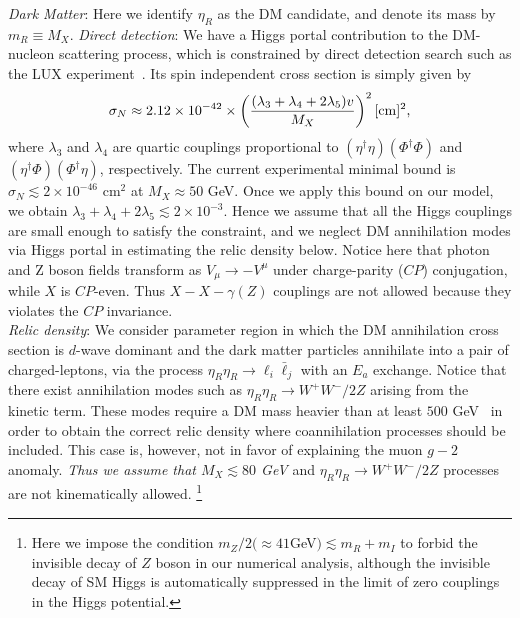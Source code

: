 \documentclass[%
showkeys,12pt,
preprint,preprintnumbers,nofootinbib,
groupedaddress,superscriptaddress,amsmath,amssymb]{revtex4}
\numberwithin{equation}{section}
\begin{document}
{\it Dark Matter}:
Here we identify $\eta_R$ as the DM candidate, and denote its mass by $m_{R}\equiv M_X$. 
{
{\it Direct detection}: We have a Higgs portal contribution to the DM-nucleon scattering process, which is constrained by direct detection search such as the LUX experiment~\cite{Akerib:2016vxi}.
Its spin independent cross section is simply given by~\cite{Baek:2016kud}
\begin{align}
\sigma_N\approx 2.12\times 10^{-42}\times\left(\frac{(\lambda_3+\lambda_4+2\lambda_5)v}{M_X}\right)^2 [{\rm cm}]^2,
\end{align}
where $\lambda_3$ and $\lambda_4$ are quartic couplings proportional to $(\eta^\dag\eta)(\Phi^\dag\Phi)$ and $(\eta^\dag\Phi)(\Phi^\dag\eta)$, respectively.
The current experimental minimal bound is $\sigma_N\lesssim 2\times 10^{-46}$ cm$^2$ at $M_X\approx 50$ GeV. Once we apply this bound on our model, we obtain $\lambda_3+\lambda_4+2\lambda_5\lesssim 2\times10^{-3}$. Hence we assume that all the Higgs couplings are small enough to satisfy the constraint, and we neglect DM annihilation modes via Higgs portal in estimating the relic density below. 
Notice here that photon and Z boson {fields transform as $V_\mu \to - V^\mu$ under 
charge-parity ($CP$) conjugation, while $X$ is $CP$-even.
Thus $X-X-\gamma(Z)$ couplings are not allowed because they violates the 
$CP$ invariance.}
\\
{\it Relic density}:}
We consider parameter region in which the DM annihilation cross section is $d$-wave dominant and the dark matter
particles annihilate into a pair of charged-leptons, via the process
$\eta_R \eta_R \to \ell_i \bar \ell_j$ with an $E_a$ exchange. 
{
Notice that there exist annihilation modes such as $\eta_R \eta_R \to W^+ W^-/ 2Z$ {arising} from the kinetic term.  
These modes require {a DM mass heavier} than at least 
$500$ GeV~\cite{Hambye:2009pw} in order to obtain the correct relic density where coannihilation processes should be included.  
This case is, however, not in favor of explaining the muon $g-2$ anomaly. {\it Thus we assume {that} $M_X\lesssim 80$ GeV} and $\eta_R \eta_R \to W^+ W^-/ 2Z$ processes are not kinematically allowed.
\footnote{%
Here we impose the condition 
$m_Z/2(\approx 41$GeV$)\lesssim m_R+m_I$ to forbid the invisible decay of 
$Z$ boson in our numerical analysis, although the invisible decay of 
SM Higgs is automatically suppressed in the limit of zero couplings in the
Higgs potential. }}
\end{document}

